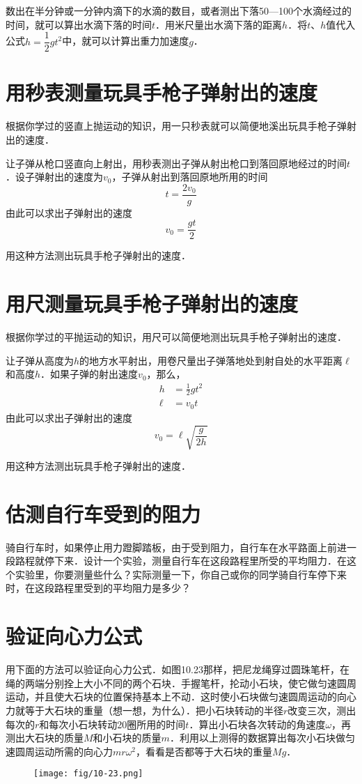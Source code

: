 数出在半分钟或一分钟内滴下的水滴的数目，或者测出下落50—100个水滴经过的时间，就可以算出水滴下落的时间$t$．用米尺量出水滴下落的距离$h$．将$t$、$h$值代入公式$h=\dfrac{1}{2}gt^2$中，就可以计算出重力加速度$g$．

\section{用秒表测量玩具手枪子弹射出的速度}
根据你学过的竖直上抛运动的知识，用一只秒表就可以简便地溪出玩具手枪子弹射出的速度．

让子弹从枪口竖直向上射出，用秒表测出子弹从射出枪口到落回原地经过的时间$t$．设子弹射出的速度为$v_0$，子弹从射出到落回原地所用的时间
\[t=\frac{2v_0}{g}\]
由此可以求出子弹射出的速度
\[v_0=\frac{gt}{2}\]

用这种方法测出玩具手枪子弹射出的速度．

\section{用尺测量玩具手枪子弹射出的速度}
根据你学过的平抛运动的知识，用尺可以简便地测出玩具手枪子弹射出的速度．

让子弹从高度为$h$的地方水平射出，用卷尺量出子弹落地处到射自处的水平距离$\ell$和高度$h$．如果子弹的射出速度$v_0$，那么，
\[\begin{split}
    h&=\frac{1}{2}gt^2\\
    \ell&=v_0t
\end{split}\]
由此可以求出子弹射出的速度
\[v_0=\ell \sqrt{\frac{g}{2h}}\]

用这种方法测出玩具手枪子弹射出的速度．

\section{估测自行车受到的阻力}

骑自行车时，如果停止用力蹬脚踏板，由于受到阻力，自行车在水平路面上前进一段路程就停下来．设计一个实验，测量自行车在这段路程里所受的平均阻力．在这个实验里，你要测量些什么？实际测量一下，你自己或你的同学骑自行车停下来时，在这段路程里受到的平均阻力是多少？

\section{验证向心力公式}
用下面的方法可以验证向心力公式．如图10.23那样，把尼龙绳穿过圆珠笔杆，在绳的两端分别拴上大小不同的两个石块．手握笔杆，抡动小石块，使它做匀速圆周运动，并且使大石块的位置保持基本上不动．这时使小石块做匀速圆周运动的向心力就等于大石块的重量（想一想，为什么）．把小石块转动的半径$r$改变三次，测出每次的$r$和每次小石块转动20圈所用的时间$t$．算出小石块各次转动的角速度$\omega$，再测出大石块的质量$M$和小石块的质量$m$．利用以上测得的数据算出每次小石块做匀速圆周运动所需的向心力$mr\omega^2$，看看是否都等于大石块的重量$Mg$．
\begin{figure}[htp]\centering
    \texttt{[image: fig/10-23.png]}
    \caption{}
    \end{figure}

